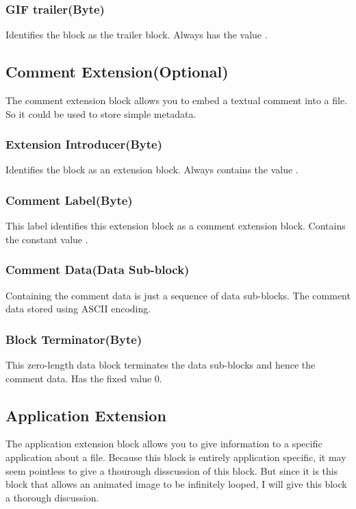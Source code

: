 \subsubsection{GIF trailer(Byte)}

Identifies the block as the trailer block. Always has the value
.

\subsection{Comment Extension(Optional)}

The comment extension block allows you to embed a textual comment into
a \gif file. So it could be used to store simple metadata.

\subsubsection{Extension Introducer(Byte)}

Identifies the block as an extension block. Always contains the
value .

\subsubsection{Comment Label(Byte)}

This label identifies this extension block as a comment extension
block. Contains the constant value .

\subsubsection{Comment Data(Data Sub-block)}

Containing the comment data is just a sequence of data sub-blocks. The
comment data stored using ASCII encoding.

\subsubsection{Block Terminator(Byte)}

This zero-length data block terminates the data sub-blocks and hence
the comment data. Has the fixed value $0$.

\subsection{Application Extension}

The application extension block allows you to give information to a
specific application about a \gif file. Because this block is
entirely application specific, it may seem pointless to give a
thourough disscussion of this block. But since it is this block that
allows an animated \gif image to be infinitely looped, I will give this
block a thorough discussion.

